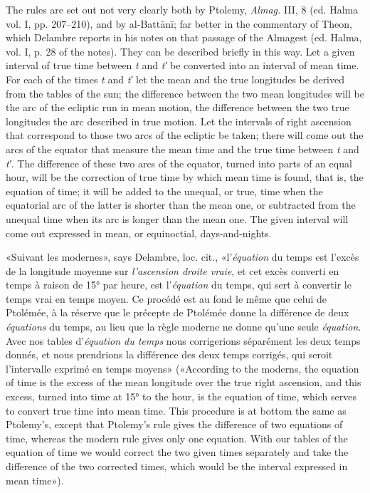 \documentclass[11pt]{article}
\newcommand{\Pg}[1]{\marginpar{\footnotesize\color{gray}#1}}
\begin{document}
\par \Pg{I 223}The rules are set out not very clearly both by Ptolemy, \emph{Almag.} III, 8 (ed. Halma vol. I, pp. 207–210), and by al-Battānī; far better in the commentary of Theon, which Delambre reports in his notes on that passage of the Almagest (ed. Halma, vol. I, p. 28 of the notes). They can be described briefly in this way. Let a given interval of true time between \emph{t} and \emph{t′} be converted into an interval of mean time. For each of the times \emph{t} and \emph{t′} let the mean and the true longitudes be derived from the tables of the sun; the difference between the two mean longitudes will be the arc of the ecliptic run in mean motion, the difference between the two true longitudes the arc described in true motion. Let the intervals of right ascension that correspond to those two arcs of the ecliptic be taken; there will come out the arcs of the equator that measure the mean time and the true time between \emph{t} and \emph{t′}. The difference of these two arcs of the equator, turned into parts of an equal hour, will be the correction of true time by which mean time is found, that is, the equation of time; it will be added to the unequal, or true, time when the equatorial arc of the latter is shorter than the mean one, or subtracted from the unequal time when its arc is longer than the mean one. The given interval will come out expressed in mean, or equinoctial, days-and-nights.\par
\par «Suivant les modernes», says Delambre, loc. cit., «l’\emph{équation} du temps est l’excès de la longitude moyenne sur \emph{l’ascension droite vraie}, et cet excès converti en temps à raison de 15° par heure, est l’\emph{équation} du temps, qui sert à convertir le temps vrai en temps moyen. Ce procédé est au fond le même que celui de Ptolémée, à la réserve que le précepte de Ptolémée donne la différence de deux \emph{équations} du temps, au lieu que la règle moderne ne donne qu’une seule \emph{équation}. Avec nos tables d’\emph{équation du temps} nous corrigerions séparément les deux temps donnés, et nous prendrions la différence des deux temps corrigés, qui seroit l’intervalle exprimé en temps moyens» («According to the moderns, the equation of time is the excess of the mean longitude over the true right ascension, and this excess, turned into time at 15° to the hour, is the equation of time, which serves to convert true time into mean time. This procedure is at bottom the same as Ptolemy's, except that Ptolemy's rule gives the difference of two equations of time, whereas the modern rule gives only one equation. With our tables of the equation of time we would correct the two given times separately and take the difference of the two corrected times, which would be the interval expressed in mean time»).\par
\end{document}
